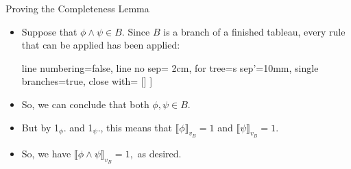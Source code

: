 \begin{frame}{Proving the Completeness Lemma}

\begin{itemize}
\itemsep=16pt

		
			\item Suppose that $\phi\land \psi\in B$. Since $B$ is a branch of a finished tableau, every rule that can be applied has been applied:
			\begin{center}
				\begin{prooftree}
					{
					line numbering=false,
					line no sep= 2cm,
					for tree={s sep'=10mm},
					single branches=true,
					close with=\xmark
					}
					[\phi\land\psi [\phi [\psi ] ] ]
					\end{prooftree}
				\end{center}
		\item So, we can conclude that both $\phi,\psi\in B$. 
		
		\item But by 1$_\phi$. and 1$_\psi$., this means that $\llbracket\phi\rrbracket_{v_B}=1$ and $\llbracket\psi\rrbracket_{v_B}=1$. 
		
		\item So, we have $\llbracket\phi\land \psi\rrbracket_{v_B}=1,$ as desired.
		
	\end{itemize}
		

\end{frame}

